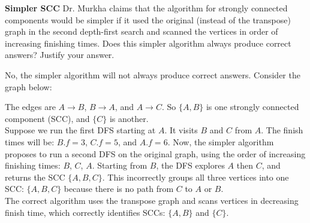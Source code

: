 \textbf{Simpler SCC }
Dr. Murkha claims that the algorithm for strongly connected components would be simpler if it used
the original (instead of the transpose) graph in the second depth-first search and scanned the vertices
in order of increasing finishing times. Does this simpler algorithm always produce correct answers?
Justify your answer.
\begin{customsolutionbox}
    No, the simpler algorithm will not always produce correct answers. Consider the graph below:

    \begin{center}
    \end{center}

    The edges are $A \to B$, $B \to A$, and $A \to C$. So $\{A, B\}$ is one strongly connected component (SCC), and $\{C\}$ is another. \\


    Suppose we run the first DFS starting at $A$. It visits $B$ and $C$ from $A$. The finish times will be: $B.f = 3$, $C.f = 5$, and $A.f = 6$. 
    Now, the simpler algorithm proposes to run a second DFS on the original graph, using the order of increasing finishing times: $B$, $C$, $A$. 
    Starting from $B$, the DFS explores $A$ then $C$, and returns the SCC $\{A, B, C\}$. This incorrectly groups all three vertices into one SCC: $\{A, B, C\}$ because 
    there is no path from $C$ to $A$ or $B$. \\

    The correct algorithm uses the transpose graph and scans vertices in decreasing finish time, which correctly identifies SCCs: $\{A, B\}$ and $\{C\}$.
\end{customsolutionbox}
